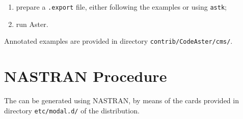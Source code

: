 \begin{enumerate}
\item prepare a \texttt{.export} file, either following the examples
or using \texttt{astk};

\item run Aster.

\end{enumerate} %
Annotated examples are provided in directory \texttt{contrib/CodeAster/cms/}.



\section{NASTRAN Procedure}
\label{sec:APP:EL:STRUCT:JOINT:MODAL:NASTRAN}

The  can be generated using NASTRAN,
by means of the  cards provided in directory \texttt{etc/modal.d/}
of the distribution.

